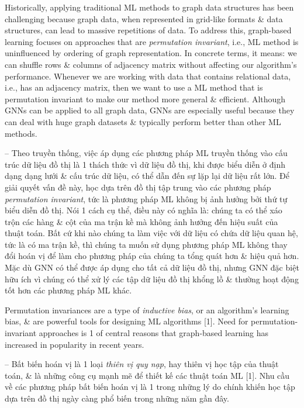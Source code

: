 \documentclass{article}
\begin{document}
\begin{itemize}
\begin{itemize}
\begin{itemize}
            Historically, applying traditional ML methods to graph data structures has been challenging because graph data, when represented in grid-like formats \& data structures, can lead to massive repetitions of data. To address this, graph-based learning focuses on approaches that are {\it permutation invariant}, i.e., ML method is uninfluenced by ordering of graph representation. In concrete terms, it means: we can shuffle rows \& columns of adjacency matrix without affecting our algorithm's performance. Whenever we are working with data that contains relational data, i.e., has an adjacency matrix, then we want to use a ML method that is permutation invariant to make our method more general \& efficient. Although GNNs can be applied to all graph data, GNNs are especially useful because they can deal with huge graph datasets \& typically perform better than other ML methods.

            -- Theo truyền thống, việc áp dụng các phương pháp ML truyền thống vào cấu trúc dữ liệu đồ thị là 1 thách thức vì dữ liệu đồ thị, khi được biểu diễn ở định dạng dạng lưới \& cấu trúc dữ liệu, có thể dẫn đến sự lặp lại dữ liệu rất lớn. Để giải quyết vấn đề này, học dựa trên đồ thị tập trung vào các phương pháp {\it permutation invariant}, tức là phương pháp ML không bị ảnh hưởng bởi thứ tự biểu diễn đồ thị. Nói 1 cách cụ thể, điều này có nghĩa là: chúng ta có thể xáo trộn các hàng \& cột của ma trận kề mà không ảnh hưởng đến hiệu suất của thuật toán. Bất cứ khi nào chúng ta làm việc với dữ liệu có chứa dữ liệu quan hệ, tức là có ma trận kề, thì chúng ta muốn sử dụng phương pháp ML không thay đổi hoán vị để làm cho phương pháp của chúng ta tổng quát hơn \& hiệu quả hơn. Mặc dù GNN có thể được áp dụng cho tất cả dữ liệu đồ thị, nhưng GNN đặc biệt hữu ích vì chúng có thể xử lý các tập dữ liệu đồ thị khổng lồ \& thường hoạt động tốt hơn các phương pháp ML khác.

            Permutation invariances are a type of {\it inductive bias}, or an algorithm's learning bias, \& are powerful tools for designing ML algorithms [1]. Need for permutation-invariant approaches is 1 of central reasons that graph-based learning has increased in popularity in recent years.

            -- Bất biến hoán vị là 1 loại {\it thiên vị quy nạp}, hay thiên vị học tập của thuật toán, \& là những công cụ mạnh mẽ để thiết kế các thuật toán ML [1]. Nhu cầu về các phương pháp bất biến hoán vị là 1 trong những lý do chính khiến học tập dựa trên đồ thị ngày càng phổ biến trong những năm gần đây.


\end{itemize}
\end{itemize}
\end{itemize}
\end{document}
